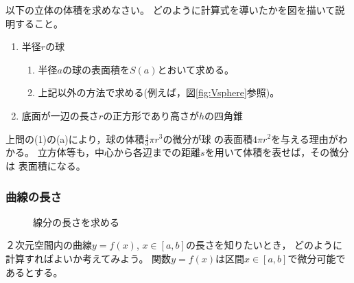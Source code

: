 \documentclass[twocolumn,11pt]{jarticle}
\begin{document}
\question
以下の立体の体積を求めなさい。
どのように計算式を導いたかを図を描いて説明すること。
\begin{enumerate}
\item 半径$r$の球
  \begin{enumerate}
  \item 半径$a$の球の表面積を$S(a)$とおいて求める。
  \item 上記以外の方法で求める(例えば，図\ref{fig:Vsphere}参照)。
  \end{enumerate}
\item 底面が一辺の長さ$r$の正方形であり高さが$h$の四角錐
\end{enumerate}
\comment 上問の(1)の(a)により，球の体積$\frac{4}{3}\pi r^3$の微分が球
の表面積$4\pi r^2$を与える理由がわかる。
立方体等も，中心から各辺までの距離$s$を用いて体積を表せば，その微分は
表面積になる。

\subsubsection{曲線の長さ}
\begin{figure}[h]
  \begin{center}
    \caption{線分の長さを求める}
    \label{fig:int_line}
  \end{center}
\end{figure}

２次元空間内の曲線$y=f(x)$, $x\in[a,b]$の長さを知りたいとき，
どのように計算すればよいか考えてみよう。
関数$y=f(x)$は区間$x\in[a,b]$で微分可能であるとする。
\end{document}
